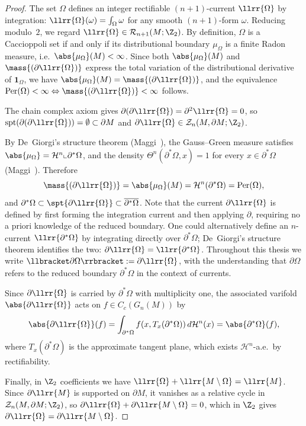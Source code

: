 \begin{proof}
The set $\Omega$ defines an integer rectifiable $(n{+}1)$-current $\llrr{\Omega}$ by integration: $\llrr{\Omega}(\omega) = \int_\Omega \omega$ for any smooth $(n{+}1)$-form $\omega$. Reducing modulo~$2$, we regard $\llrr{\Omega} \in \mathcal{R}_{n+1}(M; \Z_2)$. By definition, $\Omega$ is a Caccioppoli set if and only if its distributional boundary $\mu_\Omega$ is a finite Radon measure, i.e.\ $\abs{\mu_\Omega}(M) < \infty$. Since both $\abs{\mu_\Omega}(M)$ and $\mass{(\partial\llrr{\Omega})}$ express the total variation of the distributional derivative of $\mathbf{1}_\Omega$, we have $\abs{\mu_\Omega}(M) = \mass{(\partial\llrr{\Omega})}$, and the equivalence $\mathrm{Per}(\Omega) < \infty \Leftrightarrow \mass{(\partial\llrr{\Omega})} < \infty$ follows.

The chain complex axiom gives $\partial(\partial\llrr{\Omega}) = \partial^2\llrr{\Omega} = 0$, so $\mathrm{spt}(\partial(\partial\llrr{\Omega})) = \emptyset \subset \partial M$ and $\partial\llrr{\Omega} \in \mathcal{Z}_n(M, \partial M; \Z_2)$.

By De~Giorgi's structure theorem (Maggi~\cite[Theorem~15.9]{Mag12}), the Gauss--Green measure satisfies $\abs{\mu_\Omega} = \mathcal{H}^n \llcorner \partial^*\Omega$, and the density $\Theta^n(\partial^*\Omega, x) = 1$ for every $x \in \partial^*\Omega$ (Maggi~\cite[Corollary~15.8]{Mag12}). Therefore
\[
\mass{(\partial\llrr{\Omega})} = \abs{\mu_\Omega}(M) = \mathcal{H}^n(\partial^*\Omega) = \mathrm{Per}(\Omega),
\]
and $\partial^*\Omega \subset \spt{\partial\llrr{\Omega}} \subset \overline{\partial^*\Omega}$. Note that the current $\partial\llrr{\Omega}$ is defined by first forming the integration current and then applying $\partial$, requiring no a priori knowledge of the reduced boundary. One could alternatively define an $n$-current $\llrr{\partial^*\Omega}$ by integrating directly over $\partial^*\Omega$; De~Giorgi's structure theorem identifies the two: $\partial\llrr{\Omega} = \llrr{\partial^*\Omega}$. Throughout this thesis we write $\llbracket\partial\Omega\rrbracket := \partial\llrr{\Omega}$, with the understanding that $\partial\Omega$ refers to the reduced boundary $\partial^*\Omega$ in the context of currents.

Since $\partial\llrr{\Omega}$ is carried by $\partial^*\Omega$ with multiplicity one, the associated varifold $\abs{\partial\llrr{\Omega}}$ acts on $f \in C_c(G_n(M))$ by
\[
\abs{\partial\llrr{\Omega}}(f) = \int_{\partial^*\Omega} f(x, T_x(\partial^*\Omega)) \, d\mathcal{H}^n(x) = \abs{\partial^*\Omega}(f),
\]
where $T_x(\partial^*\Omega)$ is the approximate tangent plane, which exists $\mathcal{H}^n$-a.e.\ by rectifiability.

Finally, in $\Z_2$ coefficients we have $\llrr{\Omega} + \llrr{M \setminus \Omega} = \llrr{M}$. Since $\partial\llrr{M}$ is supported on $\partial M$, it vanishes as a relative cycle in $\mathcal{Z}_{n}(M, \partial M; \Z_2)$, so $\partial\llrr{\Omega} + \partial\llrr{M \setminus \Omega} = 0$, which in $\Z_2$ gives $\partial\llrr{\Omega} = \partial\llrr{M \setminus \Omega}$.
\end{proof}

